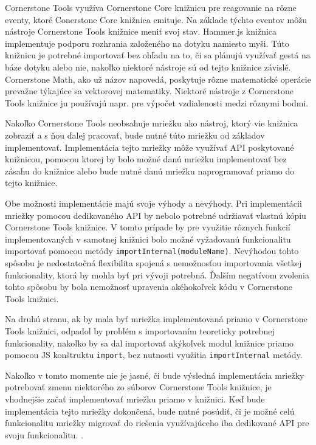 Cornerstone Tools využíva Cornerstone Core knižnicu pre reagovanie na rôzne eventy, ktoré Conerstone Core knižnica emituje. Na základe týchto eventov môžu nástroje Cornerstone Tools knižnice meniť svoj stav.
Hammer.js knižnica implementuje podporu rozhrania založeného na dotyku namiesto myši. Túto knižnicu je potrebné importovať bez ohľadu na to, či sa plánujú využívať gestá na báze dotyku alebo nie, nakoľko niektoré nástroje sú od tejto knižnice závislé.
Cornerstone Math, ako už názov napovedá, poskytuje rôzne matematické operácie prevažne týkajúce sa vektorovej matematiky. Niektoré nástroje z Cornerstone Tools knižnice ju používajú napr. pre výpočet vzdialenosti medzi rôznymi bodmi.

Nakoľko Cornerstone Tools neobsahuje mriežku ako nástroj, ktorý vie knižnica zobraziť a s ňou ďalej pracovať, bude nutné túto mriežku od základov implementovať. Implementácia tejto mriežky môže využívať API poskytované knižnicou, pomocou ktorej by bolo možné danú mriežku implementovať bez zásahu do knižnice alebo bude nutné danú mriežku naprogramovať priamo do tejto knižnice.

Obe možnosti implementácie majú svoje výhody a nevýhody.
Pri implementácii mriežky pomocou dedikovaného API by nebolo potrebné udržiavať vlastnú kópiu Cornerstone Tools knižnice. V tomto prípade by pre využitie rôznych funkcií implementovaných v samotnej knižnici bolo možné vyžadovanú funkcionalitu importovať pomocou metódy \texttt{importInternal(moduleName)}. Nevýhodou tohto spôsobu je nedostatočná flexibilita spojená s nemožnosťou importovania všetkej funkcionality, ktorá by mohla byť pri vývoji potrebná. Ďalším negatívom zvolenia tohto spôsobu by bola nemožnosť upravenia akéhokoľvek kódu v Cornerstone Tools knižnici.

Na druhú stranu, ak by mala byť mriežka implementovaná priamo v Cornerstone Tools knižnici, odpadol by problém s importovaním teoreticky potrebnej funkcionality, nakoľko by sa dal importovať akýkoľvek modul knižnice priamo pomocou JS konštruktu \texttt{import}, bez nutnosti využitia \texttt{importInternal} metódy.

Nakoľko v tomto momente nie je jasné, či bude výsledná implementácia mriežky potrebovať zmenu niektorého zo súborov Cornerstone Tools knižnice, je vhodnejšie začať implementovať mriežku priamo v knižnici. Keď bude implementácia tejto mriežky dokončená, bude nutné posúdiť, či je možné celú funkcionalitu mriežky migrovať do riešenia využívajúceho iba dedikované API pre svoju funkcionalitu.  .

